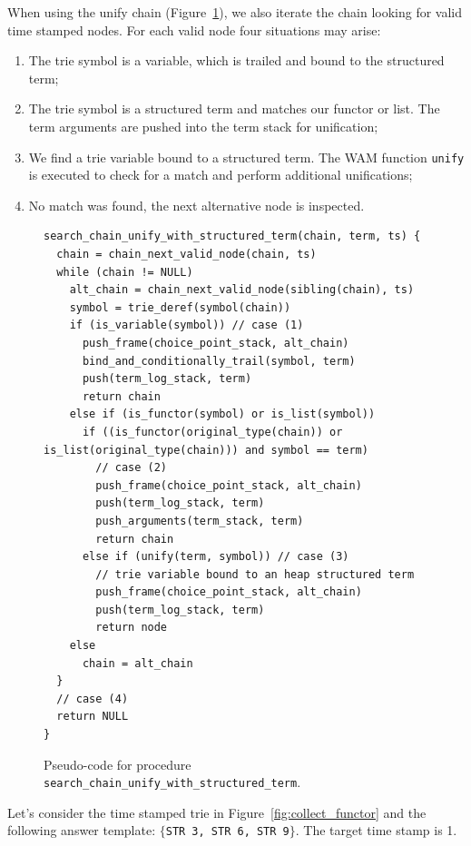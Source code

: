 \begin{samepage}
When using the unify chain (Figure~\ref{fig:search_chain_unify_with_structured_term}),
we also iterate the chain looking for valid time stamped nodes. For each valid node
four situations may arise:

\begin{enumerate}
  \item The trie symbol is a variable, which is trailed and bound to the structured term;
  \item The trie symbol is a structured term and matches our functor or list.
  The term arguments are pushed into the term stack for unification;
  \item We find a trie variable bound to a structured term. The WAM function \texttt{unify}
  is executed to check for a match and perform additional unifications;
  \item No match was found, the next alternative node is inspected.
\end{enumerate}
\end{samepage}

\begin{figure}[ht]
\begin{Verbatim}
search_chain_unify_with_structured_term(chain, term, ts) {
  chain = chain_next_valid_node(chain, ts)
  while (chain != NULL)
    alt_chain = chain_next_valid_node(sibling(chain), ts)
    symbol = trie_deref(symbol(chain))
    if (is_variable(symbol)) // case (1)
      push_frame(choice_point_stack, alt_chain)
      bind_and_conditionally_trail(symbol, term)
      push(term_log_stack, term)
      return chain
    else if (is_functor(symbol) or is_list(symbol))
      if ((is_functor(original_type(chain)) or is_list(original_type(chain))) and symbol == term)
        // case (2)
        push_frame(choice_point_stack, alt_chain)
        push(term_log_stack, term)
        push_arguments(term_stack, term)
        return chain
      else if (unify(term, symbol)) // case (3)
        // trie variable bound to an heap structured term
        push_frame(choice_point_stack, alt_chain)
        push(term_log_stack, term)
        return node
    else
      chain = alt_chain
  }
  // case (4)
  return NULL
}
\end{Verbatim}
\caption{Pseudo-code for procedure \texttt{search\_chain\_unify\_with\_structured\_term}.}
\label{fig:search_chain_unify_with_structured_term}
\end{figure}

Let's consider the time stamped trie in Figure~\ref{fig:collect_functor}
and the following answer template: $\{$\texttt{STR 3, STR 6, STR 9}$\}$.
The target time stamp is 1.


